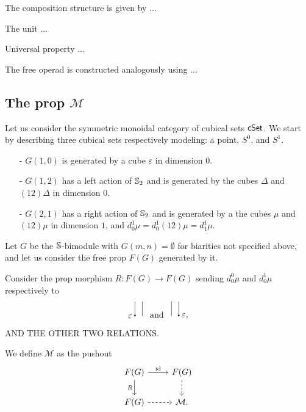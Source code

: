The composition structure is given by ...

The unit ...

Universal property ...

The free operad is constructed analogously using ...

\subsection{The prop $\mathcal M$}

Let us consider the symmetric monoidal category of cubical sets $\cSet$. We start by describing three cubical sets respectively modeling: a point, $S^0$, and $S^1$.
\begin{itemize}
	\item[-]$G(1, 0)$ is generated by a cube $\varepsilon$ in dimension $0$.
	\item[-]$G(1, 2)$ has a left action of $\S_2$ and is generated by the cubes $\Delta$ and $(12)\Delta$ in dimension $0$.
	\item[-]$G(2, 1)$ has a right action of $\S_2$ and is generated by a the cubes $\mu$ and $(12)\mu$ in dimension $1$, and $d_0^1 \mu = d_0^1 (12) \mu = d_1^1 \mu$.
\end{itemize}
Let $G$ be the $\S$-bimodule with $G(m, n) = \emptyset$ for biarities not specified above, and let us consider the free prop $F(G)$ generated by it.

Consider the prop morphism $R \colon F(G) \to F(G)$ sending $d_0^0 \mu$ and $d_0^1 \mu$ respectively to
\begin{equation*}
	\begin{tikzpicture}[scale=.15]
	\draw (-4,0)--(-4,4);
	\draw (-6,0)--(-6,4);
	\draw [fill] (-6,.2) circle [radius=.2];
	\node [left] at (-6,0) {$\varepsilon$};
	
	\node at (0,.4) {and};
	
	\draw (4,0)--(4,4);
	\draw (6,0)--(6,4);
	\draw [fill] (6,.2) circle [radius=.2];
	\node [right] at (6,0) {$\varepsilon$,};
	\end{tikzpicture}
\end{equation*}
AND THE OTHER TWO RELATIONS. 

We define $\mathcal M$ as the pushout
\begin{equation*}
\begin{tikzcd}
F(G) \arrow[r, "\id"] \arrow[d, "R"'] & F(G) \arrow[d, dashed] \\
F(G) \arrow[r, dashed] & \mathcal M. \\
\end{tikzcd}
\end{equation*}